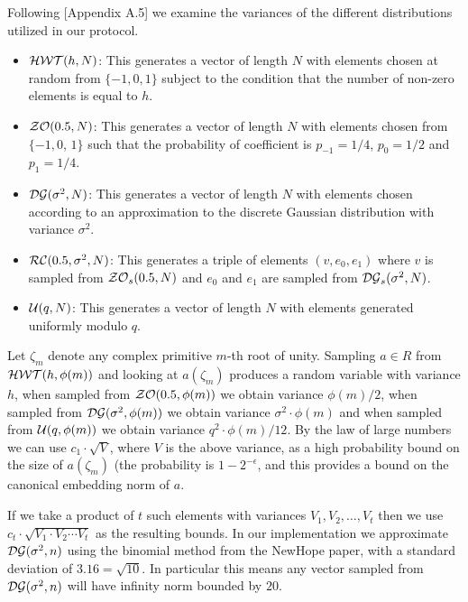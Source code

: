 Following \cite{GHS12c}[Appendix A.5] we examine the variances
of the different distributions utilized in our protocol.
\begin{itemize}
\item $\mathcal{HWT}(h,N)$: This generates a vector of length $N$
      with elements chosen at random from $\{-1,0,1\}$ subject to
      the condition that the number of non-zero elements is equal to $h$.
\item $\mathcal{ZO}(0.5,N)$:  This generates a vector of length $N$
      with elements chosen from $\{-1,0$, $1\}$ such that the
      probability of coefficient is $p_{-1}=1/4$, $p_0=1/2$
      and $p_1=1/4$.
\item $\mathcal{DG}(\sigma^2,N)$: This generates a vector of
      length $N$ with elements chosen according to an approximation to
      the discrete Gaussian distribution with variance $\sigma^2$.
\item $\mathcal{RC}(0.5,\sigma^2,N)$: This generates a triple of
      elements $(v,e_0,e_1)$ where $v$ is sampled from $\mathcal{ZO}_s(0.5,N)$
      and $e_0$ and $e_1$ are sampled from $\mathcal{DG}_s(\sigma^2,N)$.
\item $\mathcal{U}(q,N)$: This generates a vector of length $N$ 
      with elements generated uniformly modulo $q$.
\end{itemize}
Let $\zeta_m$ denote any complex primitive $m$-th root of unity.
Sampling $a \in R$ from $\mathcal{HWT}(h,\phi(m))$ and looking at $a(\zeta_m)$
produces a random variable with variance $h$, when sampled
from $\mathcal{ZO}(0.5,\phi(m))$ we obtain variance $\phi(m)/2$,
when sampled from $\mathcal{DG}(\sigma^2,\phi(m))$ we obtain variance
$\sigma^2 \cdot \phi(m)$ and when sampled from $\mathcal{U}(q,\phi(m))$
we obtain variance $q^2 \cdot \phi(m)/12$.
By the law of large numbers we can use $c_1 \cdot \sqrt{V}$,
where $V$ is the above variance, as a high probability bound
on the size of $a(\zeta_m)$ (the probability is $1-2^{-\epsilon}$, 
and this provides a bound on the canonical embedding norm of $a$.

If we take a product of $t$ such
elements with variances $V_1, V_2, \ldots, V_t$
then we use $c_t \cdot \sqrt{V_1 \cdot V_2 \cdots V_t}$
as the resulting bounds.
In our implementation we approximate $\mathcal{DG}(\sigma^2,n)$ using
the binomial method from the NewHope paper, with a standard
deviation of $3.16 = \sqrt{10}$. In particular this means
any vector sampled from $\mathcal{DG}(\sigma^2,n)$ will have
infinity norm bounded by $20$.


